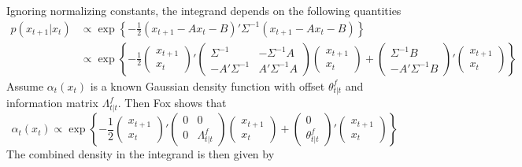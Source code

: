 \documentclass[12pt]{article}
\begin{document}
Ignoring normalizing constants, the integrand depends on the following quantities
\begin{align*}
p(x_{t+1}|x_t)&\propto \exp\left\{-\frac{1}{2}(x_{t+1}-Ax_t-B)'\Sigma^{-1}(x_{t+1}-Ax_t-B)\right\}\\
&\propto \exp\left\{-\frac{1}{2}\begin{pmatrix}x_{t+1}\\x_t\end{pmatrix}'
    \begin{pmatrix}\Sigma^{-1} & -\Sigma^{-1}A\\
    -A'\Sigma^{-1} & A'\Sigma^{-1}A\end{pmatrix}\begin{pmatrix}x_{t+1}\\x_t\end{pmatrix}
    + \begin{pmatrix}\Sigma^{-1}B\\-A'\Sigma^{-1}B\end{pmatrix}'\begin{pmatrix}x_{t+1}\\x_t\end{pmatrix}\right\}
\end{align*}
Assume $\alpha_t(x_t)$ is a known Gaussian density function with offset $\theta^f_{t|t}$ and information matrix $\Lambda^f_{t|t}$. Then Fox shows that
\[\alpha_t(x_t)\propto\exp\left\{-\frac{1}{2}\begin{pmatrix}x_{t+1}\\x_t\end{pmatrix}'
    \begin{pmatrix}0 & 0\\
    0 & \Lambda^f_{t|t}\end{pmatrix}\begin{pmatrix}x_{t+1}\\x_t\end{pmatrix}
    + \begin{pmatrix}0\\ \theta^f_{t|t}\end{pmatrix}'\begin{pmatrix}x_{t+1}\\x_t\end{pmatrix}\right\}\]
The combined density in the integrand is then given by
\end{document}
